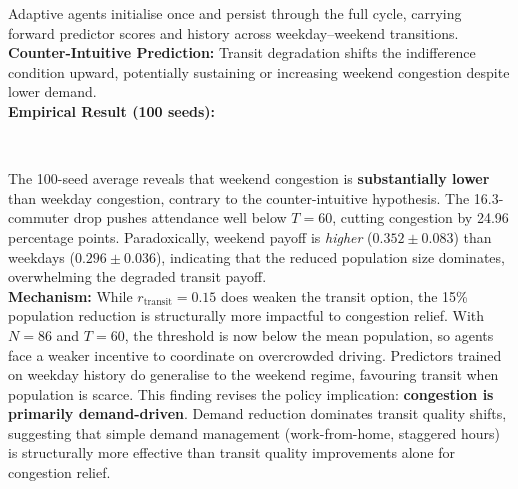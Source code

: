 Adaptive agents initialise once and persist through the full cycle, carrying forward predictor scores and history across weekday--weekend transitions. \\

\textbf{Counter-Intuitive Prediction:} Transit degradation shifts the indifference condition upward, potentially sustaining or increasing weekend congestion despite lower demand. \\

\textbf{Empirical Result (100 seeds):} \\

\begin{table}[H]
\centering
\small
{} \\
\caption{Weekend effect: 15\% population reduction with 50\% transit quality degradation}
\end{table}

The 100-seed average reveals that weekend congestion is \textbf{substantially lower} than weekday congestion, contrary to the counter-intuitive hypothesis. The 16.3-commuter drop pushes attendance well below $T=60$, cutting congestion by 24.96 percentage points. Paradoxically, weekend payoff is \textit{higher} ($0.352 \pm 0.083$) than weekdays ($0.296 \pm 0.036$), indicating that the reduced population size dominates, overwhelming the degraded transit payoff. \\

\textbf{Mechanism:} While $r_{\text{transit}}=0.15$ does weaken the transit option, the 15\% population reduction is structurally more impactful to congestion relief. With $N=86$ and $T=60$, the threshold is now below the mean population, so agents face a weaker incentive to coordinate on overcrowded driving. Predictors trained on weekday history do generalise to the weekend regime, favouring transit when population is scarce. This finding revises the policy implication: \textbf{congestion is primarily demand-driven}. Demand reduction dominates transit quality shifts, suggesting that simple demand management (work-from-home, staggered hours) is structurally more effective than transit quality improvements alone for congestion relief. \\

